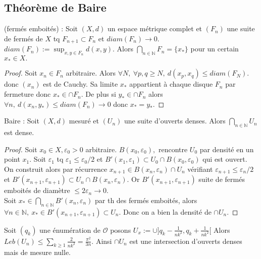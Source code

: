 \subsection{Théorème de Baire}
\begin{lemme}
    (fermés emboités) : Soit $(X,d)$ un espace métrique complet et $(F_n)$ une suite de fermés de $X$ tq $F_{n+1}\subset F_n$ et $diam(F_n)\to 0.$ $diam(F_n):=\sup_{x,y\in F_n}d(x,y)$. Alors $\bigcap\limits_{n\in \mathbb{N} } F_n=\{x_*\} $ pour un certain $x_*\in X.$
\end{lemme}
\begin{proof}
    Soit $x_{n}\in F_n$ arbitraire. Alors $\forall N,\ \forall p,q\ge N,\ d(x_p,x_q)\le diam(F_N).  $ donc $(x_{n})$ est de Cauchy. Sa limite $x_*$ appartient à chaque disque $F_n$ par fermeture donc $x_*\in \cap F_n.$ De plus si $y_*\in \cap F_n$ alors $\forall n,\ d(x_{n},y_*)\le diam(F_n)\to 0 $ donc $x_*=y_*$.
\end{proof}
\begin{theoreme}
    Baire : Soit $(X,d)$ mesuré et $(U_n)$ une suite d'ouverts denses. Alors $\bigcap\limits_{n\in \mathbb{N} } U_n$ est dense.
\end{theoreme}
\begin{proof}
    Soit $x_0\in X, \varepsilon _0 >0$ arbitraire. $B(x_0,\varepsilon _0),$ rencontre $U_0$ par densité en un point $x_1.$ Soit $\varepsilon _1$ tq $\varepsilon _1\le \varepsilon _0 /2$ et $B'(x_1,\varepsilon _1)\subset U_0\cap B(x_0,\varepsilon _0)$ qui est ouvert.\\
    On construit alors par récurrence $x_{n+1}\in B(x_n,\varepsilon _n)\cap U_n$ vérifiant $\varepsilon _{n+1}\le \varepsilon _n /2$ et $B'(x_{n+1},\varepsilon _{n+1})\subset U_n\cap B(x_{n},\varepsilon _n)$. Or $B'(x_{n+1},\varepsilon _{n+1})$ suite de fermés emboités de diamètre $\le 2\varepsilon _n\to 0$.\\
    Soit $x_*\in \bigcap\limits_{n\in \mathbb{N} } B'(x_n,\varepsilon _n)$ par th des fermés emboités, alors $\forall n\in \mathbb{N} ,\ x_*\in B'(x_{n+1},\varepsilon _{n+1})\subset U_n $. Donc on a bien la densité de $\cap U_n$.
\end{proof}
\begin{ex}
    Soit $(q_k)$ une énumération de $\mathcal{O}$ posons $U_x:=\cup ]q_k-\frac{1}{nk^2},q_k+\frac{1}{nk^2}[$ Alors $Leb(U_n)\le \sum\limits_{k\ge 1}^{} \frac{2}{nk^2}=\frac{\pi^2}{3n}$. Ainsi $\cap U_n$ est une intersection d'ouverts denses mais de mesure nulle.
\end{ex}

